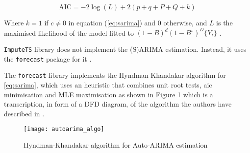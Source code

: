\begin{equation}
	\text{AIC} = -2\log(L) + 2(p+q+P+Q+k)
\end{equation}

Where $k=1$ if $c\neq0$ in equation (\ref{eq:sarima}) and $0$ otherwise, and $L$ is the maximised likelihood of the model fitted to $(1-B)^d (1-B^s)^D \{Y_t\}$ \cite{autoarimaLib}.  

\texttt{ImputeTS} library does not implement the (S)ARIMA estimation. Instead, it uses the \texttt{forecast} package for it \cite{imputeTS}.

The \texttt{forecast} library implements the Hyndman-Khandakar algorithm for \ref{eq:sarima}, which uses an heuristic that combines unit root tests, \ac{aic} minimisation and MLE maximisation as shown in Figure \ref{alg:autoarima} which is a transcription, in form of a DFD diagram, of the algorithm the authors have described in \cite{autoarimaLib}.

\begin{figure}[h]
	\centering
	\texttt{[image: autoarima\_algo]}
	\caption{Hyndman-Khandakar algorithm for Auto-ARIMA estimation}
	\label{alg:autoarima}
\end{figure}
 
